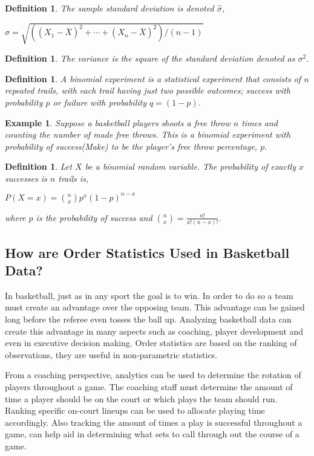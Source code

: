 \documentclass[11pt,a4paper]{article}
\theoremstyle{plain}
\newtheorem{de}[fact]{Definition}
\newtheorem{exmp}[fact]{Example}
\begin{document}
\begin{de}
The sample standard deviation is denoted $\hat{\sigma}$,
\begin{center}
$\hat{\sigma} = \sqrt{((X_1-\bar{X})^2+\cdots+(X_n-\bar{X})^2)/(n-1)}$
\end{center}
\end{de}

\begin{de}
The variance is the square of the standard deviation denoted as $\sigma^2$.
\end{de}

\begin{de}
A binomial experiment is a statistical experiment that consists of $n$ repeated trails, with each trail having just two possible outcomes; success with probability $p$ or failure with probability $q=(1-p)$.
\end{de}

\begin{exmp}
Suppose a basketball players shoots a free throw $n$ times and counting the number of made free throws. This is a binomial experiment with probability of success(Make) to be the player's free throw percentage, $p$. 
\end{exmp}

\begin{de}
Let $X$ be a binomial random variable. The probability of exactly $x$ successes is $n$ trails is,
\begin{center}
$P(X=x)=\binom{n}{x}p^x(1-p)^{n-x}$
\end{center}
where $p$ is the probability of success and $\binom{n}{x}=\frac{n!}{x!(n-x)!}$.
\end{de}
 
\newpage
\subsection*{How are Order Statistics Used in Basketball Data?}

In basketball, just as in any sport the goal is to win. In order to do so a team must create an advantage over the opposing team. This advantage can be gained long before the referee even tosses the ball up. Analyzing basketball data can create this advantage in many aspects such as coaching, player development and even in executive decision making. Order statistics are based on the ranking of observations, they are useful in non-parametric statistics. 

From a coaching perspective, analytics can be used to determine the rotation of players throughout a game. The coaching staff must determine the amount of time a player should be on the court or which plays the team should run. Ranking specific on-court lineups can be used to allocate playing time accordingly. Also tracking the amount of times a play is successful throughout a game, can help aid in determining what sets to call through out the course of a game.
\end{document}
